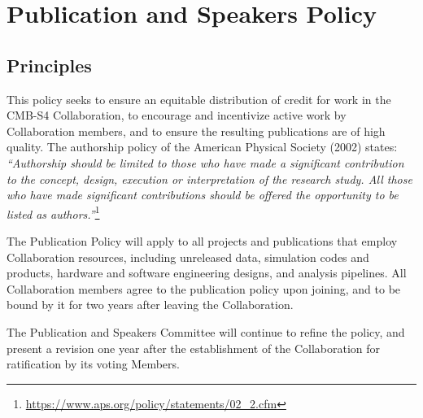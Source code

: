 \documentclass[12pt]{article}
\begin{document}


%


%

\section{Publication and Speakers Policy}
\label{sec:pub}
\subsection{Principles}
This policy seeks to ensure an equitable distribution of credit for work in the CMB-S4 Collaboration, to encourage and incentivize active work by Collaboration members, and to ensure the resulting publications are of high quality. The authorship policy of the American Physical Society (2002) states: \textit{``Authorship should be limited to those who have made a significant contribution to the concept, design, execution or interpretation of the research study. All those who have made significant contributions should be offered the opportunity to be listed as authors.''}\footnote{\url{https://www.aps.org/policy/statements/02_2.cfm}}

The Publication Policy will apply to all projects and publications that employ Collaboration resources, including unreleased data, simulation codes and products, hardware and software
engineering designs, and analysis pipelines. All Collaboration members agree to the publication policy upon joining, and to be bound by it for two years after leaving the Collaboration.

{\color{red} 
The Publication and Speakers Committee will continue to refine the policy, and present a revision one year after the establishment of the Collaboration for ratification by its voting Members.
}
\end{document}
